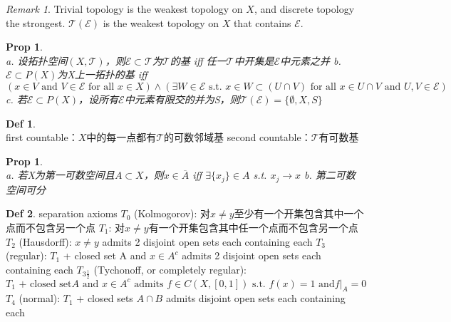 \documentclass[hidelinks]{article}
\theoremstyle{definition}
\newtheorem*{defin}{Def}
\theoremstyle{plain}
\newtheorem{proposition}[theorem]{Prop}
\theoremstyle{remark}
\newtheorem*{remark}{Remark}
\begin{document}
\begin{remark}
Trivial topology is the weakest topology on $X$, and discrete topology the strongest. $\mathscr{T}(\mathscr{E})$ is the weakest topology on $X$ that contains $\mathscr{E}$.
\end{remark}

\begin{proposition}~\\
a. 设拓扑空间$(X,\mathscr{T})$，则$\mathscr{E}\subset \mathscr{T}$为$\mathscr{T}$的基 \textrm{iff} 任一$\mathscr{T}$中开集是$\mathscr{E}$中元素之并 \newline
b. $\mathscr{E}\subset P(X)$为X上一拓扑的基 \textrm{iff} 
\[
(x\in V\textrm{ and }V\in \mathscr{E}\textrm{ for all } x\in X)\wedge(\exists W\in \mathscr{E}\textrm{ s.t. }x\in W\subset (U\cap V)\textrm{ for all }x\in U\cap V\textrm{ and }U,V\in \mathscr{E})
\]
c. 若$\mathscr{E}\subset P(X)$，设所有$\mathscr{E}$中元素有限交的并为S，则$\mathscr{T}(\mathscr{E})=\{\emptyset,X,S\}$
\end{proposition}

\begin{defin}~\\
first countable：$X$中的每一点都有$\mathscr{T}$的可数邻域基 \newline
second countable：$\mathscr{T}$有可数基
\end{defin}

\begin{proposition}~\\ \label{Prop 4.3}
a. 若X为第一可数空间且$A\subset X$，则$x\in \overline{A}$ \textrm{iff} $\exists\{x_j\}\in A$ \textrm{s.t. }$x_j\to x$ \newline
b. 第二可数空间可分
\end{proposition}

\begin{defin}
separation axioms \newline
$T_0$ (Kolmogorov): 对$x\neq y$至少有一个开集包含其中一个点而不包含另一个点 \newline
$T_1$: 对$x\neq y$有一个开集包含其中任一个点而不包含另一个点 \newline
$T_2$ (Hausdorff): $x\neq y$ admits 2 disjoint open sets each containing each \newline
$T_3$ (regular): $T_1$ + closed set A and $x\in A^c$ admits 2 disjoint open sets each containing each \newline
$T_{3\frac{1}{2}}$ (Tychonoff, or completely regular):
$$
T_1\textrm{ + closed set} A\textrm{ and } x\in A^c \textrm{ admits } f\in C(X,[0,1]) \textrm{ s.t. } f(x)=1 \textrm{ and} \left.f\right|_A=0
$$
$T_4$ (normal): $T_1$ + closed sets $A\cap B$ admits  disjoint open sets each containing each
\end{defin}
\end{document}
